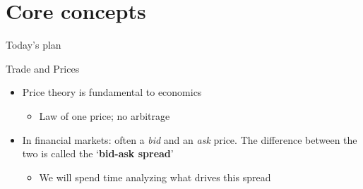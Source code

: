 \documentclass[english,10pt
,aspectratio=169
]{beamer}
\begin{document}
%


\section{Core concepts}

\begin{frame}{Today's plan}
	\tableofcontents[currentsection]
\end{frame}

\begin{frame}{Trade and Prices}
\begin{itemize}
	\item Price theory is fundamental to economics
	\begin{itemize}
		\item Law of one price; no arbitrage
	\end{itemize}
	\item In financial markets: often a \textit{bid} and an \textit{ask} price. The difference between the two is called the `\textbf{bid-ask spread}'
	\begin{itemize}
		\item We will spend time analyzing what drives this spread
	\end{itemize}
\end{itemize}
\end{frame}
\end{document}
